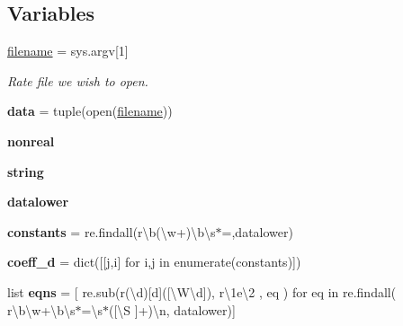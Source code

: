 \subsection*{Variables}
\begin{DoxyCompactItemize}
\item 
\mbox{\label{namespacesimplify__rates_a4d43fee0fbf9678d90c62926c876680c}} 
\mbox{\hyperlink{namespacesimplify__rates_a4d43fee0fbf9678d90c62926c876680c}{filename}} = sys.\+argv\mbox{[}1\mbox{]}
\begin{DoxyCompactList}\small\item\em Rate file we wish to open. \end{DoxyCompactList}\item 
\mbox{\label{namespacesimplify__rates_accb9a5eaca8a4c894674fd7328df1ac3}} 
{\bfseries data} = tuple(open(\mbox{\hyperlink{namespacesimplify__rates_a4d43fee0fbf9678d90c62926c876680c}{filename}}))
\item 
\mbox{\label{namespacesimplify__rates_acf232c01e969293f2f939cec89a778b9}} 
{\bfseries nonreal}
\item 
\mbox{\label{namespacesimplify__rates_a103cda6412711765c1f0b9e76b8d6531}} 
{\bfseries string}
\item 
\mbox{\label{namespacesimplify__rates_a0464575d1bab331bf7939b87961ffa6f}} 
{\bfseries datalower}
\item 
\mbox{\label{namespacesimplify__rates_aa522a07e391b2e485d618a63fa902532}} 
{\bfseries constants} = re.\+findall(r\textquotesingle{}\textbackslash{}b(\textbackslash{}w+)\textbackslash{}b\textbackslash{}s$\ast$=\textquotesingle{},datalower)
\item 
\mbox{\label{namespacesimplify__rates_ade82266907adfa43d287db8ad95cb173}} 
{\bfseries coeff\+\_\+d} = dict(\mbox{[}\mbox{[}j,i\mbox{]} for i,j in enumerate(constants)\mbox{]})
\item 
\mbox{\label{namespacesimplify__rates_ac6883fe98ae952d900de0c35ca9edba0}} 
list {\bfseries eqns} = \mbox{[} re.\+sub(r\textquotesingle{}(\textbackslash{}d)\mbox{[}d\mbox{]}(\mbox{[}\textbackslash{}W\textbackslash{}d\mbox{]})\textquotesingle{}, r\textquotesingle{}\textbackslash{}1e\textbackslash{}2\textquotesingle{} , eq ) for eq in re.\+findall( r\textquotesingle{}\textbackslash{}b\textbackslash{}w+\textbackslash{}b\textbackslash{}s$\ast$=\textbackslash{}s$\ast$(\mbox{[}\textbackslash{}\+S \mbox{]}+)\textbackslash{}n\textquotesingle{}, datalower)\mbox{]}

\end{DoxyCompactItemize}
